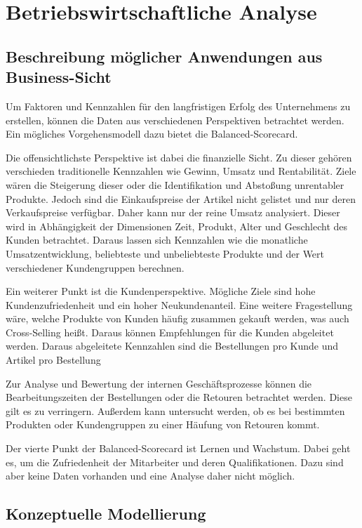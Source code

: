 \section{Betriebswirtschaftliche Analyse}
\subsection{Beschreibung möglicher Anwendungen aus Business-Sicht}

Um Faktoren und Kennzahlen für den langfristigen Erfolg des Unternehmens zu erstellen, können die Daten aus verschiedenen Perspektiven betrachtet werden. Ein mögliches Vorgehensmodell dazu bietet die Balanced-Scorecard.

Die  offensichtlichste Perspektive ist dabei die finanzielle Sicht. Zu dieser gehören verschieden traditionelle Kennzahlen wie Gewinn, Umsatz und Rentabilität. Ziele wären die Steigerung dieser oder die Identifikation und Abstoßung unrentabler Produkte. Jedoch sind die Einkaufspreise der Artikel nicht gelistet und nur deren Verkaufspreise verfügbar. Daher kann nur der reine Umsatz analysiert. Dieser wird in Abhängigkeit der Dimensionen Zeit, Produkt, Alter und Geschlecht des Kunden betrachtet. Daraus lassen sich Kennzahlen wie die monatliche Umsatzentwicklung, beliebteste und unbeliebteste Produkte und der Wert verschiedener Kundengruppen berechnen.

Ein weiterer Punkt ist die Kundenperspektive. Mögliche Ziele sind hohe Kundenzufriedenheit und ein hoher Neukundenanteil. Eine weitere Fragestellung wäre, welche Produkte von Kunden häufig zusammen gekauft werden, was auch Cross-Selling heißt. Daraus können Empfehlungen für die Kunden abgeleitet werden. Daraus abgeleitete Kennzahlen sind die Bestellungen pro Kunde und Artikel pro Bestellung

Zur Analyse und Bewertung der internen Geschäftsprozesse können die Bearbeitungszeiten der Bestellungen oder die Retouren betrachtet werden. Diese gilt es zu verringern. Außerdem kann untersucht werden, ob es bei bestimmten Produkten oder Kundengruppen zu einer Häufung von Retouren kommt.

Der vierte Punkt der Balanced-Scorecard ist Lernen und Wachstum. Dabei geht es, um die Zufriedenheit der Mitarbeiter und deren Qualifikationen. Dazu sind aber keine Daten vorhanden und eine Analyse daher nicht möglich.

\pagebreak

\subsection{Konzeptuelle Modellierung}

